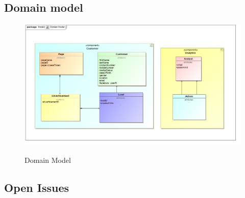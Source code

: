 \documentclass{article}
\begin{document}
\subsection{Domain model}

\begin{figure}[H]
\includegraphics[width=\textwidth]{images/class__Domain_Model.jpg}  \\
\caption{Domain Model}
\end{figure}

\subsection{Open Issues}
\end{document}
